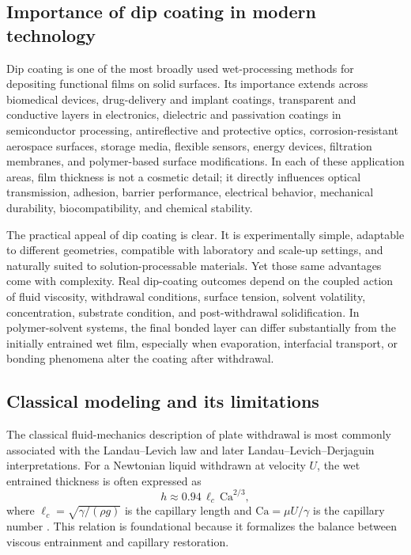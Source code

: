 \documentclass[11pt]{article}
\begin{document}
\subsection{Importance of dip coating in modern technology}
Dip coating is one of the most broadly used wet-processing methods for depositing functional films on solid surfaces. Its importance extends across biomedical devices, drug-delivery and implant coatings, transparent and conductive layers in electronics, dielectric and passivation coatings in semiconductor processing, antireflective and protective optics, corrosion-resistant aerospace surfaces, storage media, flexible sensors, energy devices, filtration membranes, and polymer-based surface modifications. In each of these application areas, film thickness is not a cosmetic detail; it directly influences optical transmission, adhesion, barrier performance, electrical behavior, mechanical durability, biocompatibility, and chemical stability.

The practical appeal of dip coating is clear. It is experimentally simple, adaptable to different geometries, compatible with laboratory and scale-up settings, and naturally suited to solution-processable materials. Yet those same advantages come with complexity. Real dip-coating outcomes depend on the coupled action of fluid viscosity, withdrawal conditions, surface tension, solvent volatility, concentration, substrate condition, and post-withdrawal solidification. In polymer-solvent systems, the final bonded layer can differ substantially from the initially entrained wet film, especially when evaporation, interfacial transport, or bonding phenomena alter the coating after withdrawal.

\subsection{Classical modeling and its limitations}
The classical fluid-mechanics description of plate withdrawal is most commonly associated with the Landau--Levich law and later Landau--Levich--Derjaguin interpretations. For a Newtonian liquid withdrawn at velocity $U$, the wet entrained thickness is often expressed as
\begin{equation}
h \approx 0.94 \, \ell_c \, \mathrm{Ca}^{2/3},
\end{equation}
where $\ell_c = \sqrt{\gamma/(\rho g)}$ is the capillary length and $\mathrm{Ca} = \mu U/\gamma$ is the capillary number \cite{landau1942,rio2017}. This relation is foundational because it formalizes the balance between viscous entrainment and capillary restoration.
\end{document}
